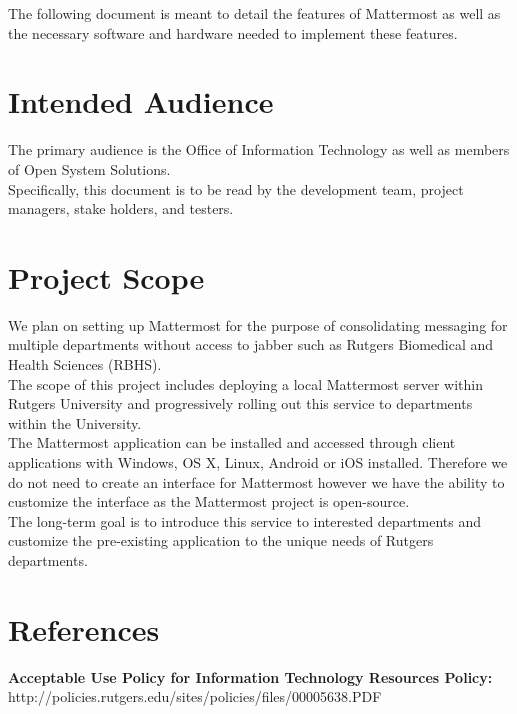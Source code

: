 \documentclass{scrreprt}
\begin{document}
The following document is meant to detail the features of Mattermost as well as
the necessary software and hardware needed to implement these features.

\section{Intended Audience}
The primary audience is the Office of Information Technology as well as members
of Open System Solutions.\\

Specifically, this document is to be read by the development team,
project managers, stake holders, and testers.

\section{Project Scope}
We plan on setting up Mattermost for the purpose of consolidating messaging for
multiple departments without access to jabber such as Rutgers Biomedical
and Health Sciences (RBHS).\\

The scope of this project includes deploying a local Mattermost server within
Rutgers University and progressively rolling out this service to departments
within the University.\\

The Mattermost application can be installed and accessed through client
applications with Windows, OS X, Linux, Android or iOS installed.  Therefore we
do not need to create an interface for Mattermost however we have the ability
to customize the interface as the Mattermost project is open-source.\\

The long-term goal is to introduce this service to interested departments and
customize the pre-existing application to the unique needs of Rutgers
departments.

\section{References}
\textbf{Acceptable Use Policy for Information Technology Resources Policy:}\\
http://policies.rutgers.edu/sites/policies/files/00005638.PDF\\
\end{document}
